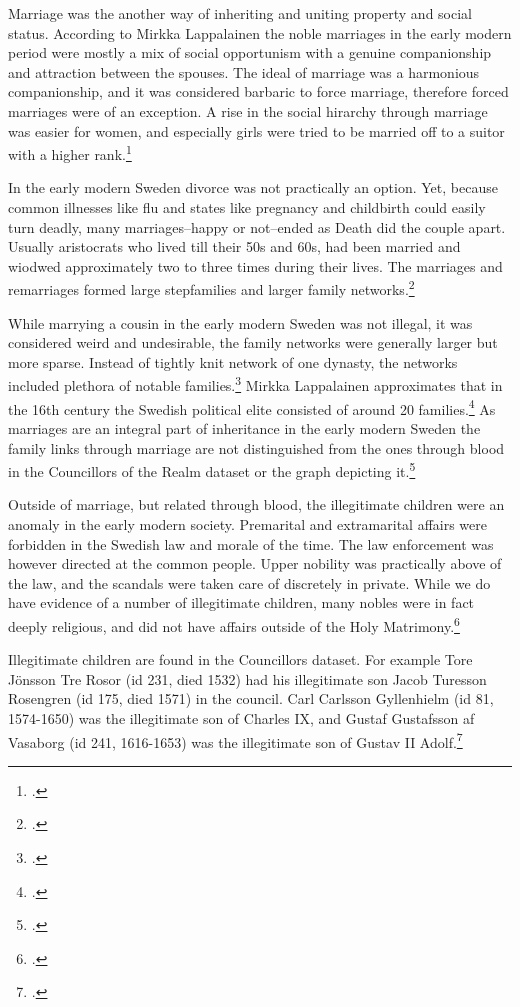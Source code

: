 Marriage was the another way of inheriting and uniting property and social status. According to Mirkka Lappalainen the noble marriages in the early modern period were mostly a mix of social opportunism with a genuine companionship and attraction between the spouses. The ideal of marriage was a harmonious companionship, and it was considered barbaric to force marriage, therefore forced marriages were of an exception. A rise in the social hirarchy through marriage was easier for women, and especially girls were tried to be married off to a suitor with a higher rank.\footcite[pp. 33-42.]{lappalainen06}

In the early modern Sweden divorce was not practically an option. Yet, because common illnesses like flu and states like pregnancy and childbirth could easily turn deadly, many marriages–happy or not–ended as Death did the couple apart. Usually aristocrats who lived till their 50s and 60s, had been married and wiodwed approximately two to three times during their lives. The marriages and remarriages formed large stepfamilies and larger family networks.\footcite[pp. 35-42.]{lappalainen06}

While marrying a cousin in the early modern Sweden was not illegal, it was considered weird and undesirable, the family networks were generally larger but more sparse. Instead of tightly knit network of one dynasty, the networks included plethora of notable families.\footcite[p. 40.]{lappalainen06} Mirkka Lappalainen approximates that in the 16th century the Swedish political elite consisted of around 20 families.\footcite[p. 55.]{lappalainen09} As marriages are an integral part of inheritance in the early modern Sweden the family links through marriage are not distinguished from the ones through blood in the Councillors of the Realm dataset or the graph depicting it.\footcite{councillorsDS}

Outside of marriage, but related through blood, the illegitimate children were an anomaly in the early modern society. Premarital and extramarital affairs were forbidden in the Swedish law and morale of the time. The law enforcement was however directed at the common people. Upper nobility was practically above of the law, and the scandals were taken care of discretely in private. While we do have evidence of a number of illegitimate children, many nobles were in fact deeply religious, and did not have affairs outside of the Holy Matrimony.\footcite[pp. 36-37.]{lappalainen06}

Illegitimate children are found in the Councillors dataset. For example Tore Jönsson Tre Rosor (id 231, died 1532) had his illegitimate son Jacob Turesson Rosengren (id 175, died 1571) in the council. Carl Carlsson Gyllenhielm (id 81, 1574-1650) was the illegitimate son of Charles IX, and Gustaf Gustafsson af Vasaborg (id 241, 1616-1653) was the illegitimate son of Gustav II Adolf.\footcite{councillorsDS}

